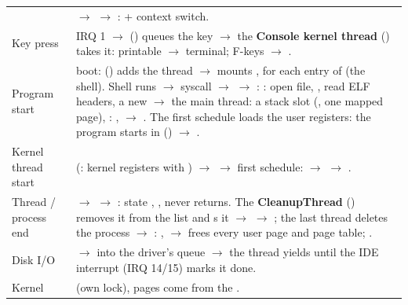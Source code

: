\begin{center}
\begin{longtable}{L{2.6cm}L{12.2cm}}
\addlinespace
{} &
 $\to$  $\to$ :  + context switch. \\
\addlinespace
Key press &
IRQ 1 $\to$  () queues the key $\to$ the \textbf{Console kernel thread} () takes it: printable $\to$ terminal; F-keys $\to$ . \\
\addlinespace
Program start &
boot:  () adds the  thread $\to$  mounts ,  for each entry of  (the shell).
Shell runs  $\to$  syscall $\to$  $\to$ :
: open file, , read ELF headers, a new  $\to$ the main thread: a stack slot (, one mapped page), : ,  $\to$ .
The first schedule loads the user registers: the program starts in  () $\to$ . \\
\addlinespace
Kernel thread start &
 (: kernel registers with ) $\to$  $\to$ first schedule:  $\to$  $\to$ . \\
\addlinespace
Thread / process end &
 $\to$  $\to$ : state , , never returns.
The \textbf{CleanupThread} () removes it from the list and s it $\to$  $\to$ ; the last thread deletes the process $\to$ : ,  $\to$  frees every user page and page table; . \\
\addlinespace
Disk I/O &
 $\to$  into the driver's queue $\to$ the thread yields until the IDE interrupt (IRQ 14/15) marks it done. \\
\addlinespace
Kernel  &
 (own lock), pages come from the . \\
\bottomrule
\end{longtable}
\end{center}

